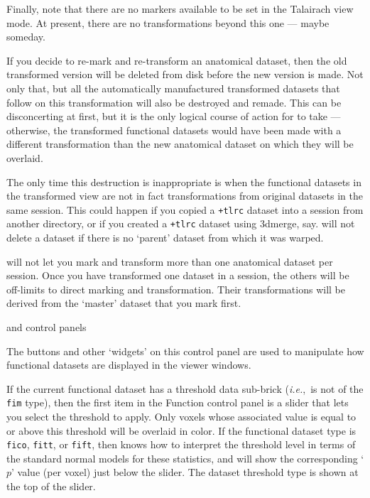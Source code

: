 Finally, note that there are no markers available to be set in the
Talairach view mode.  At present, there are no transformations beyond
this one --- maybe someday.

If you decide to re-mark and re-transform an anatomical dataset, then
the old transformed version will be deleted from disk before the new
version is made.  Not only that,
but all the automatically manufactured transformed datasets that follow
on this transformation will also be destroyed and remade.
This can be disconcerting at first, but it is the only logical course
of action for \afnit to take --- otherwise, the transformed functional
datasets would have been made with a different transformation than the
new anatomical dataset on which they will be overlaid.

The only time this destruction is inappropriate is when the
functional datasets in the transformed view are not in fact transformations
from original datasets in the same session.  This could happen if you
copied a {\tt +tlrc} dataset into a session from another directory, or
if you created a {\tt +tlrc} dataset using {\sf 3dmerge}, say.
\afnit will not delete a dataset if there is no `parent' dataset from which
it was warped.

\afnit will not let you mark and transform more than one anatomical dataset
per session.  Once you have transformed one dataset in a session,
the others will be off-limits to direct marking and transformation.
Their transformations will be derived from the `master' dataset
that you mark first.
\vspace{2ex}\goodbreak\begin{samepage}
\centerline{\epsfxsize=3.4in
            \blob\blob
            \epsfxsize=1.9in}\vspace{1ex}
\centerline{\sf {} and  control panels}
\end{samepage}\goodbreak

The buttons and other `widgets' on this control panel are used to manipulate how
functional datasets are displayed in the viewer windows.

If the current functional dataset has a threshold data
sub-brick ({\it i.e.},~is not of the {\tt fim} type),
then the first item in the Function control panel
is a slider that lets you select the threshold to apply.
Only voxels whose associated value is equal to or
above this threshold will be overlaid in color.
If the functional dataset type is {\tt fico}, {\tt fitt},
or {\tt fift}, then \afnit knows how to interpret the
threshold level in terms of the standard normal models
for these statistics, and will show the corresponding
`$p$' value (per voxel) just below the slider.  The dataset threshold
type is shown at the top of the slider.

